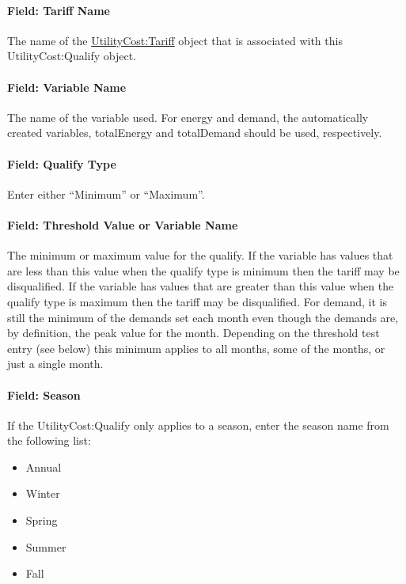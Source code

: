 \paragraph{Field: Tariff Name}\label{field-tariff-name-002}

The name of the \hyperref[utilitycosttariff]{UtilityCost:Tariff} object that is associated with this UtilityCost:Qualify object.

\paragraph{Field: Variable Name}\label{field-variable-name-001}

The name of the variable used. For energy and demand, the automatically created variables, totalEnergy and totalDemand should be used, respectively.

\paragraph{Field: Qualify Type}\label{field-qualify-type}

Enter either ``Minimum'' or ``Maximum''.

\paragraph{Field: Threshold Value or Variable Name}\label{field-threshold-value-or-variable-name}

The minimum or maximum value for the qualify. If the variable has values that are less than this value when the qualify type is minimum then the tariff may be disqualified. If the variable has values that are greater than this value when the qualify type is maximum then the tariff may be disqualified. For demand, it is still the minimum of the demands set each month even though the demands are, by definition, the peak value for the month. Depending on the threshold test entry (see below) this minimum applies to all months, some of the months, or just a single month.

\paragraph{Field: Season}\label{field-season-001}

If the UtilityCost:Qualify only applies to a season, enter the season name from the following list:

\begin{itemize}
\item
  Annual
\item
  Winter
\item
  Spring
\item
  Summer
\item
  Fall
\end{itemize}

